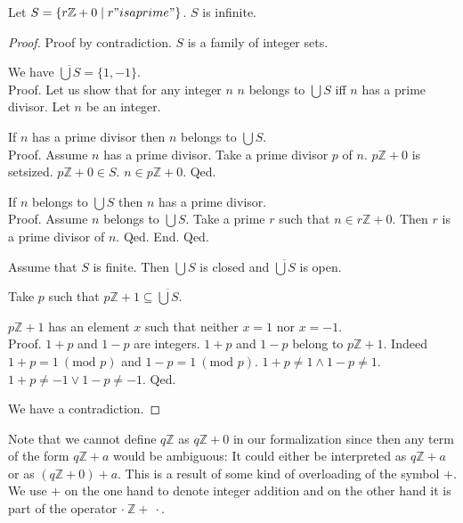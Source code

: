 \documentclass{article}
\renewcommand{\mod}{\text{mod }}
\newcommand{\Int}{\mathbb{Z}}
\begin{document}
  \begin{forthel}
    \begin{theorem}[Fuerstenberg]
      Let $S = \{ r \Int + 0 \mid r "is a prime" \}$. $S$ is infinite.
    \end{theorem}
    \begin{proof}
      Proof by contradiction. $S$ is a family of integer sets.

      We have $\overline{\bigcup S} = \{ 1, -1 \}$. \\
      Proof.
        Let us show that for any integer $n$ $n$ belongs to $\bigcup S$ iff $n$ has a prime divisor.
          Let $n$ be an integer.

          If $n$ has a prime divisor then $n$ belongs to $\bigcup S$. \\
          Proof.
            Assume $n$ has a prime divisor. Take a prime divisor $p$ of $n$. $p \Int + 0$ is setsized. $p \Int + 0 \in S$. $n \in p \Int + 0$.
          Qed.

          If $n$ belongs to $\bigcup S$ then $n$ has a prime divisor. \\
          Proof.
            Assume $n$ belongs to $\bigcup S$. Take a prime $r$ such that $n \in r \Int + 0$. Then $r$ is a prime divisor of $n$.
          Qed.
        End.
      Qed.

      Assume that $S$ is finite. Then $\bigcup S$ is closed and $\overline{\bigcup S}$ is open.

      Take $p$ such that $p \Int + 1 \subseteq \overline{\bigcup S}$.

      $p \Int + 1$ has an element $x$ such that neither $x = 1$ nor $x = -1$. \\
      Proof.
        $1 + p$ and $1 - p$ are integers. $1 + p$ and $1 - p$ belong to $p \Int + 1$. Indeed $1 + p = 1 ~(\mod p)$ and $1 - p = 1 ~(\mod p)$. $1 + p \neq  1 \wedge 1 - p \neq  1$. $1 + p \neq -1 \vee 1 - p \neq -1$.
      Qed.

      We have a contradiction.
    \end{proof}
  \end{forthel}

  Note that we cannot define $q \Int$ as $q \Int + 0$ in our formalization since then any term of the form $q \Int + a$ would be ambiguous: It could either be interpreted as $q \Int + a$ or as $(q \Int + 0) + a$. This is a result of some kind of overloading of the symbol $+$. We use $+$ on the one hand to denote integer addition and on the other hand it is part of the operator $\cdot ~ \Int + ~ \cdot$.
\end{document}

